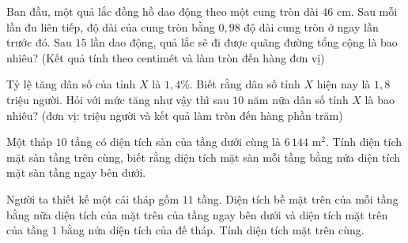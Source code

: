 \begin{ex}%
	Ban đầu, một quả lắc đồng hồ dao động theo một cung tròn dài $46$ cm. Sau mỗi lần đu liên tiếp, độ dài của cung tròn bằng  $0{,}98$ độ dài cung tròn ở ngay lần trước đó. Sau $15$ lần dao động, quả lắc sẽ đi được quãng đường tổng cộng là bao nhiêu? (Kết quả tính theo centimét và làm tròn đến hàng đơn vị)
\end{ex}

\begin{ex}%
	Tỷ lệ tăng dân số của tỉnh $X$ là $1{,}4\%$. Biết rằng dân số tỉnh $X$ hiện nay là $1{,}8$ triệu người. Hỏi với mức tăng như vậy thì  sau $10$ năm nữa dân số tỉnh $X$ là bao nhiêu? (đơn vị: triệu người và kết quả làm tròn đến hàng phần trăm)
\end{ex}

\begin{ex}%
	Một tháp $10$ tầng có diện tích sàn của tầng dưới cùng là $6\,144$ m$^2$. Tính diện tích mặt sàn tầng trên cùng, biết rằng diện tích mặt sàn mỗi tầng bằng nửa diện tích  mặt sàn tầng ngay bên dưới.
\end{ex}



\begin{ex}%
	Người ta thiết kế một cái tháp gồm $11$ tầng. Diện tích bề mặt trên của mỗi tầng bằng nữa  diện tích của mặt trên của tầng ngay bên dưới và diện tích mặt trên của tầng $1$ bằng nửa diện tích của đế tháp. Tính diện tích mặt trên cùng.
\end{ex}

